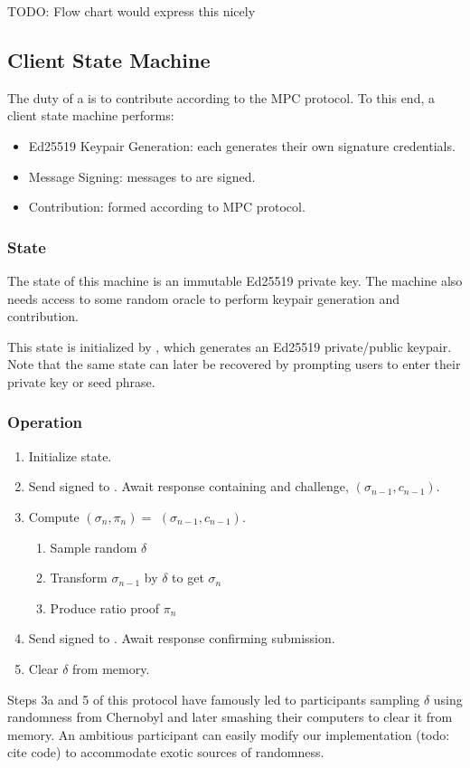 TODO: Flow chart would express this nicely

\subsection{Client State Machine}

The duty of a \Contributor{} is to contribute according to the MPC protocol. To this end, a client state machine performs:
\begin{itemize}
    \item Ed25519 Keypair Generation: each \Contributor{} generates their own signature credentials.
    \item Message Signing: messages to \Coordinator{} are signed.
    \item Contribution: formed according to MPC protocol.
\end{itemize}

\subsubsection*{State}
The state of this machine is an immutable Ed25519 private key. The machine also needs access to some random oracle to perform keypair generation and contribution.

This state is initialized by \generatekeypair{}, which generates an Ed25519 private/public keypair. Note that the same state can later be recovered by prompting users to enter their private key or seed phrase.

\subsubsection*{Operation}

\begin{enumerate}
    \item Initialize state.
    \item Send signed \QueryRequest{} to \Coordinator{}. Await response containing \MpcState{} and challenge, $(\sigma_{n-1}, c_{n-1})$.
    \item Compute $(\sigma_n, \pi_n) = $ \contribute{}$(\sigma_{n-1}, c_{n-1})$.
    \begin{enumerate}
        \item Sample random $\delta$
        \item Transform $\sigma_{n-1}$ by $\delta$ to get $\sigma_n$
        \item Produce ratio proof $\pi_n$ 
    \end{enumerate}
    \item Send signed \UpdateRequest{} to \Coordinator{}. Await response confirming submission.
    \item Clear $\delta$ from memory.
\end{enumerate}

Steps 3a and 5 of this protocol have famously led to participants sampling $\delta$ using randomness from Chernobyl and later smashing their computers to clear it from memory. An ambitious participant can easily modify our implementation (todo: cite code) to accommodate exotic sources of randomness.
